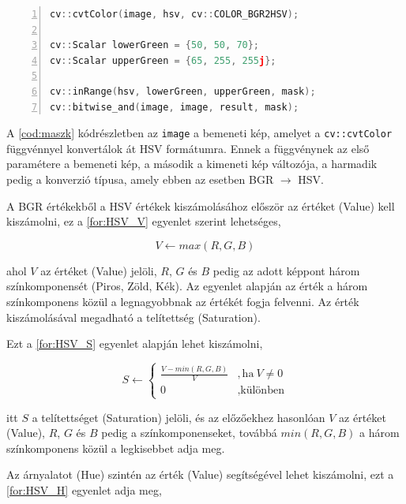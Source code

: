 \vspace{2mm}
\hspace{-10mm}
\begin{minipage}{\linewidth}
\begin{lstlisting}[language=C++, numbers=left, caption={A játékterület maszkolása.}, label={cod:maszk}]
cv::cvtColor(image, hsv, cv::COLOR_BGR2HSV);

cv::Scalar lowerGreen = {50, 50, 70};
cv::Scalar upperGreen = {65, 255, 255j};

cv::inRange(hsv, lowerGreen, upperGreen, mask);
cv::bitwise_and(image, image, result, mask);
\end{lstlisting}
\end{minipage}

\par A \ref{cod:maszk} kódrészletben az \lstinline{image} a bemeneti kép, amelyet a \lstinline{cv::cvtColor} függvénnyel \cite{opencv_docs} konvertálok át HSV formátumra. Ennek a függvénynek az első paramétere a bemeneti kép, a második a kimeneti kép változója, a harmadik pedig a konverzió típusa, amely ebben az esetben BGR $\rightarrow$ HSV.
\par A BGR értékekből a HSV értékek kiszámolásához először az értéket (Value) kell kiszámolni, ez a \ref{for:HSV_V} egyenlet\cite{opencv_docs} szerint lehetséges,

\begin{equation}
    V \leftarrow max(R,G,B)
    \label{for:HSV_V}
\end{equation}

\par ahol $V$ az értéket (Value) jelöli, $R$, $G$ és $B$ pedig az adott képpont három színkomponensét (Piros, Zöld, Kék). Az egyenlet alapján az érték a három színkomponens közül a legnagyobbnak az értékét fogja felvenni. Az érték kiszámolásával megadható a telítettség (Saturation).
\par Ezt a \ref{for:HSV_S} egyenlet\cite{opencv_docs} alapján lehet kiszámolni,

\begin{equation}
    S \leftarrow
    \begin{cases}
        \frac{V-min(R,G,B)}{V} & ,\text{ha}\ V\neq0 \\
        0 & ,\text{különben}
    \end{cases}
    \label{for:HSV_S}
\end{equation}

\par itt $S$ a telítettséget (Saturation) jelöli, és az előzőekhez hasonlóan $V$ az értéket (Value), $R$, $G$ és $B$ pedig a színkomponenseket, továbbá $min(R,G,B)$ a három színkomponens közül a legkisebbet adja meg.
\par Az árnyalatot (Hue) szintén az érték (Value) segítségével lehet kiszámolni, ezt a \ref{for:HSV_H} egyenlet\cite{opencv_docs} adja meg,

